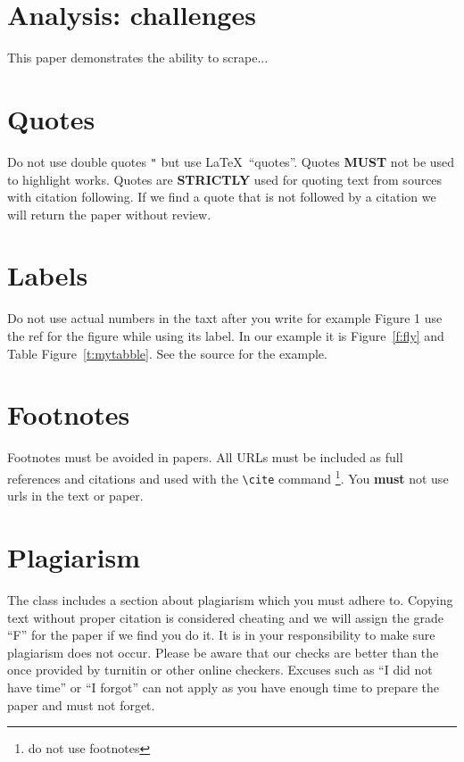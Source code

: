 \section{Analysis: challenges}

This paper demonstrates the ability to scrape...

\appendix

\section{Quotes}

Do not use double quotes \verb|"| but use \LaTeX\ ``quotes''. Quotes
{\bf MUST} not be used to highlight works. Quotes are {\bf STRICTLY}
used for quoting text from sources with citation following. If we find
a quote that is not followed by a citation we will return the paper
without review.

\section{Labels}

Do not use actual numbers in the taxt after you write for example
Figure 1 use the ref for the figure while using its label. In our
example it is Figure~\ref{f:fly} and Table Figure~\ref{t:mytabble}.
See the source for the example.

\section{Footnotes}

Footnotes must be avoided in papers. All URLs must be included as full
references and citations and used with the \verb|\cite| command
\footnote{do not use footnotes}. You {\bf must} not use urls in the
text or paper.

\section{Plagiarism}

The class includes a section about plagiarism which you must adhere
to. Copying text without proper citation is considered cheating and we
will assign the grade ``F'' for the paper if we find you do it. It is
in your responsibility to make sure plagiarism does not occur. Please
be aware that our checks are better than the once provided by turnitin
or other online checkers. Excuses such as ``I did not have time'' or
``I forgot'' can not apply as you have enough time to prepare the
paper and must not forget. 

